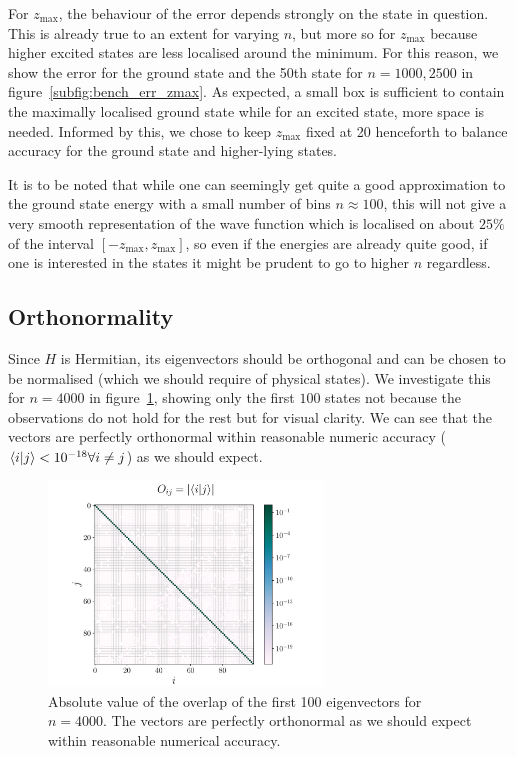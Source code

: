 \documentclass[a4paper,DIV=12,english]{scrartcl}
\begin{document}
For $z_\text{max}$, the behaviour of the error depends strongly on the state in question. This is already true to an extent for varying $n$, but more so for $z_\text{max}$ because higher excited states are less localised around the minimum. For this reason, we show the error for the ground state and the 50th state for $n=1000, 2500$ in figure~\ref{subfig:bench_err_zmax}. As expected, a small box is sufficient to contain the maximally localised ground state while for an excited state, more space is needed. Informed by this, we chose to keep $z_\text{max}$ fixed at 20 henceforth to balance accuracy for the ground state and higher-lying states.

It is to be noted that while one can seemingly get quite a good approximation to the ground state energy with a small number of bins $n\approx 100$, this will not give a very smooth representation of the wave function which is localised on about $25\%$ of the interval $[-z_\text{max}, z_\text{max}]$, so even if the energies are already quite good, if one is interested in the states it might be prudent to go to higher $n$ regardless.

\subsection{Orthonormality}
Since $H$ is Hermitian, its eigenvectors should be orthogonal and can be chosen to be normalised (which we should require of physical states). We investigate this for $n=4000$ in figure~\ref{fig:orthonormal}, showing only the first $100$ states not because the observations do not hold for the rest but for visual clarity. We can see that the vectors are perfectly orthonormal within reasonable numeric accuracy ($\braket{i|j} < 10^{-18} \forall i\neq j$) as we should expect.
\begin{figure}
    \centering
    \includegraphics[width=0.65\textwidth]{../plots/orthonormal/orthonormality.pdf}
    \caption{Absolute value of the overlap of the first 100 eigenvectors for $n=4000$. The vectors are perfectly orthonormal as we should expect within reasonable numerical accuracy. }
    \label{fig:orthonormal}
\end{figure}
\end{document}
